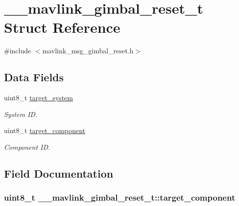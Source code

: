 \hypertarget{struct____mavlink__gimbal__reset__t}{\section{\+\_\+\+\_\+mavlink\+\_\+gimbal\+\_\+reset\+\_\+t Struct Reference}
\label{struct____mavlink__gimbal__reset__t}
}


{\ttfamily \#include $<$mavlink\+\_\+msg\+\_\+gimbal\+\_\+reset.\+h$>$}

\subsection*{Data Fields}
\begin{DoxyCompactItemize}
\item 
uint8\+\_\+t \hyperlink{struct____mavlink__gimbal__reset__t_adc46a83a37bce9a0b8f42d9938b5f61a}{target\+\_\+system}
\begin{DoxyCompactList}\small\item\em System I\+D. \end{DoxyCompactList}\item 
uint8\+\_\+t \hyperlink{struct____mavlink__gimbal__reset__t_a0b90d46508013e30cc5c5922591bfdfd}{target\+\_\+component}
\begin{DoxyCompactList}\small\item\em Component I\+D. \end{DoxyCompactList}\end{DoxyCompactItemize}


\subsection{Field Documentation}
\hypertarget{struct____mavlink__gimbal__reset__t_a0b90d46508013e30cc5c5922591bfdfd}{
\subsubsection[{target\+\_\+component}]{\setlength{\rightskip}{0pt plus 5cm}uint8\+\_\+t \+\_\+\+\_\+mavlink\+\_\+gimbal\+\_\+reset\+\_\+t\+::target\+\_\+component}}\label{struct____mavlink__gimbal__reset__t_a0b90d46508013e30cc5c5922591bfdfd}


